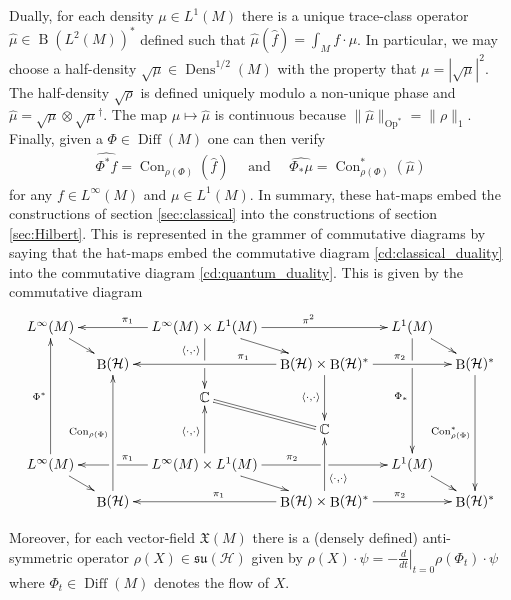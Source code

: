 \documentclass[12pt]{amsart}
\renewcommand{\H}{\ensuremath{\mathcal{H}}}
\DeclareMathOperator{\Diff}{Diff}
\DeclareMathOperator{\Dens}{Dens}
\DeclareMathOperator{\B}{B}
\DeclareMathOperator{\Op}{Op}
\DeclareMathOperator{\Con}{Con}
\begin{document}
Dually, for each density $\mu \in L^1(M)$ there is a unique trace-class operator $\hat{\mu} \in \B(L^2(M))^*$ defined
such that $ \hat{\mu} (\hat{f}) = \int_M f \cdot \mu $.
In particular, we may choose a half-density $\sqrt{\mu} \in \Dens^{1/2}(M)$ with the property that $\mu = |\sqrt{\mu}|^{2}$.
The half-density $\sqrt{\rho}$ is defined uniquely modulo a non-unique phase and $\hat{\mu} = \sqrt{\mu} \otimes \sqrt{\mu}^\dagger$.
The map $\mu \mapsto \hat{\mu}$ is continuous because $\| \hat{\mu} \|_{\Op^*} = \| \rho \|_{1}$.
Finally, given a $\Phi \in \Diff(M)$ one can then verify
\begin{align*}
	\widehat{\Phi^* f} = \Con_{\rho(\Phi)} ( \hat{f}) \quad \text{ and } \quad
	\widehat{\Phi_* \mu} = \Con_{\rho(\Phi)}^*(\hat{\mu} )
\end{align*}
for any $f \in L^\infty(M)$ and $\mu \in L^1(M)$.
In summary, these hat-maps embed the constructions of section \ref{sec:classical} into the constructions of section \ref{sec:Hilbert}.
This is represented in the grammer of commutative diagrams by saying that the hat-maps embed the commutative diagram \eqref{cd:classical_duality}
into the commutative diagram \eqref{cd:quantum_duality}.
This is given by the commutative diagram
\begin{equation}
	\xymatrix@=1em{
		L^\infty(M) \ar[dr] & & \ar[ll]_{\pi_1} L^\infty(M) \times L^1(M) \ar[dd]_<(0.2){\langle \cdot ,\cdot \rangle}|!{[dr];[dl]}\hole  \ar[dr] \ar[rr]^{\pi^2} & & L^1(M) \ar[dr] \ar[dddd]_{\Phi_*}|!{[dl];[dr]}\hole & \\
		& \B(\H) & & \ar[ll]_<(0.2){\pi_1} \B(\H) \times \B(\H)^* \ar[dd]_{\langle \cdot ,\cdot \rangle} \ar[rr]^{\pi_2} & & \B(\H)^* \ar[dddd]_{\Con^*_{\rho(\Phi)}} \\
		& & \mathbb{C} \ar@{=}[dr] & & & \\
		& & & \mathbb{C} & & \\
		L^\infty(M) \ar[dr] \ar[uuuu]^{\Phi^*} & & \ar[ll]_{\pi_1}|!{[dl];[uuul]}\hole L^\infty(M) \times L^1(M) \ar[dr]  \ar[rr]^<(0.2){\pi_2}|!{[dr];[ur]}\hole \ar[uu]^{\langle \cdot,\cdot \rangle} & & L^1(M) \ar[dr] & \\
		& \B(\H) \ar[uuuu]^{\Con_{\rho(\Phi)}} & & \ar[ll]_{\pi_1} \B(\H) \times \B(\H)^* \ar[uu]_<(0.2){\langle \cdot , \cdot \rangle} \ar[rr]^{\pi_2} & & \B(\H)^*
	}
\end{equation}

Moreover, for each vector-field $\mathfrak{X}(M)$ there is a (densely defined) anti-symmetric operator $\rho(X) \in \mathfrak{su}(\H)$
given by $\rho(X) \cdot \psi =  - \left. \frac{d}{dt} \right|_{t=0} \rho(\Phi_t) \cdot \psi$
where $\Phi_t \in \Diff(M)$ denotes the flow of $X$.
\end{document}
